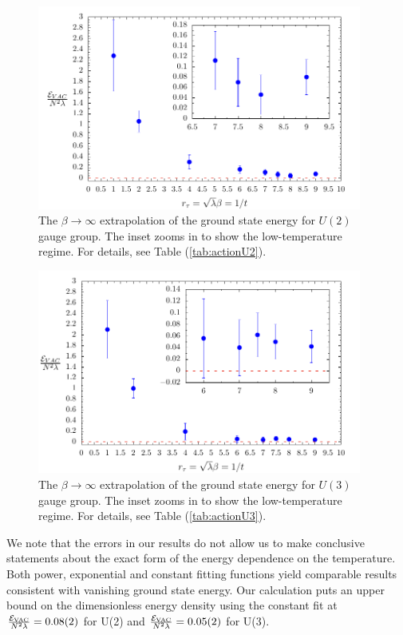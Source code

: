 \begin{figure}
\begin{center} 
\includegraphics[width=0.95\textwidth]{Figures/beta_U2.pdf}
\end{center}
\caption{\label{fig:beta_U2}The $\beta \to \infty$ extrapolation of the ground state energy for $U(2)$ gauge group. The inset zooms in to show the low-temperature regime. For details, see Table (\ref{tab:actionU2}).}
\end{figure}
\begin{figure}
\begin{center} 
\includegraphics[width=0.95\textwidth]{Figures/beta_U3.pdf}
\end{center}
\caption{\label{fig:beta_U3}The $\beta \to \infty$ extrapolation of the ground state energy for $U(3)$ gauge group. The inset zooms in to show the low-temperature regime. For details, see Table (\ref{tab:actionU3}).}
\end{figure}
We note that the errors in our results do not allow us to make conclusive statements about the exact form of the energy dependence on the temperature. Both power, exponential and constant fitting functions yield
comparable results consistent with vanishing ground state energy.  Our
calculation puts an upper bound on the dimensionless energy density using the constant fit at $\frac{\mathcal{E}_{\mathrm{VAC}}}{N^2 \lambda}=0.08(2)$ for U(2) and $\frac{\mathcal{E}_{\mathrm{VAC}}}{N^2 \lambda}=0.05(2)$ for U(3).

